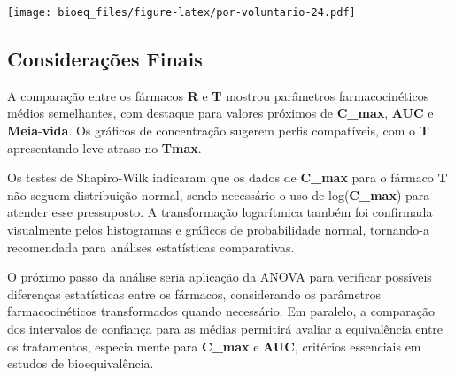 \documentclass[
]{article}
\begin{document}
\texttt{[image: bioeq\_files/figure-latex/por-voluntario-24.pdf]}

\hypertarget{considerauxe7uxf5es-finais}{%
\subsection{Considerações Finais}\label{considerauxe7uxf5es-finais}}

A comparação entre os fármacos \textbf{R} e \textbf{T} mostrou
parâmetros farmacocinéticos médios semelhantes, com destaque para
valores próximos de \textbf{C\_max}, \textbf{AUC} e
\textbf{Meia}-\textbf{vida}. Os gráficos de concentração sugerem perfis
compatíveis, com o \textbf{T} apresentando leve atraso no \textbf{Tmax}.

Os testes de Shapiro-Wilk indicaram que os dados de \textbf{C\_max} para
o fármaco \textbf{T} não seguem distribuição normal, sendo necessário o
uso de log(\textbf{C\_max}) para atender esse pressuposto. A
transformação logarítmica também foi confirmada visualmente pelos
histogramas e gráficos de probabilidade normal, tornando-a recomendada
para análises estatísticas comparativas.

O próximo passo da análise seria aplicação da ANOVA para verificar
possíveis diferenças estatísticas entre os fármacos, considerando os
parâmetros farmacocinéticos transformados quando necessário. Em
paralelo, a comparação dos intervalos de confiança para as médias
permitirá avaliar a equivalência entre os tratamentos, especialmente
para \textbf{C\_max} e \textbf{AUC}, critérios essenciais em estudos de
bioequivalência.
\end{document}
